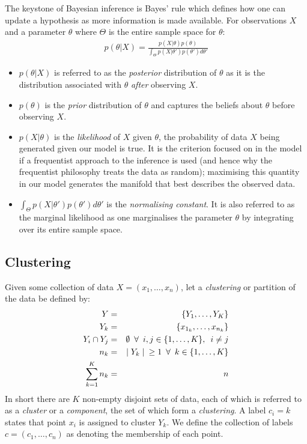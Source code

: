 \documentclass[12pt]{article} %
\begin{document}
	The keystone of Bayesian inference is Bayes' rule which defines how one can update a hypothesis as more information is made available. For observations $X$ and a parameter $\theta$ where $\Theta$ is the entire sample space for $\theta$:
	\begin{align} \label{Bayes_theorem}
	p(\theta | X) = \frac{p(X | \theta) p(\theta)}{\int_\Theta p(X | \theta ') p(\theta ') d \theta '}
	\end{align}
	\begin{itemize}
		\item $p(\theta | X)$ is referred to as the \emph{posterior} distribution of $\theta$ as it is the distribution associated with $\theta$ \emph{after} observing $X$.
		\item $p(\theta)$ is the \emph{prior} distribution of $\theta$ and captures the beliefs about $\theta$ before observing $X$.
		\item $p(X | \theta)$ is the \emph{likelihood} of $X$ given $\theta$, the probability of data $X$ being generated given our model is true. It is the criterion focused on in the model if a frequentist approach to the inference is used (and hence why the frequentist philosophy treats the data as random); maximising this quantity in our model generates the manifold that best describes the observed data. 
		\item $\int_\Theta p(X | \theta ') p(\theta ') d \theta '$ is the \emph{normalising constant}. It is also referred to as the marginal likelihood as one marginalises the parameter $\theta$ by integrating over its entire sample space.
	\end{itemize}
	
	\subsection{Clustering} \label{sec:clustering}
	Given some collection of data $X=\left(x_1,\ldots,x_n\right)$, let a \emph{clustering} or partition of the data be defined by:
	\begin{eqnarray}
	Y &=& \left\{Y_1,\ldots,Y_K\right\} \\
	Y_k &=& \left\{x_{1_k},\ldots, x_{n_k}\right\}  \\
	Y_i \cap Y_j &=& \emptyset \enskip \forall \enskip i,j \in \{1,\ldots,K\}, \enskip i \neq j \\
	n_k & = & \mid Y_k \mid \enskip \geq 1 \enskip \forall \enskip k \in \{1,\ldots,K\} \\
	\sum_{k=1}^Kn_k &=& n
	\end{eqnarray}
	In short there are $K$ non-empty disjoint sets of data, each of which is referred to as a \emph{cluster} or a \emph{component}, the set of which form a \emph{clustering}. A label $c_i=k$ states that point $x_i$ is assigned to cluster $Y_k$. We define the collection of labels $c=(c_1,\ldots,c_n)$ as denoting the membership of each point.
	
\end{document}
